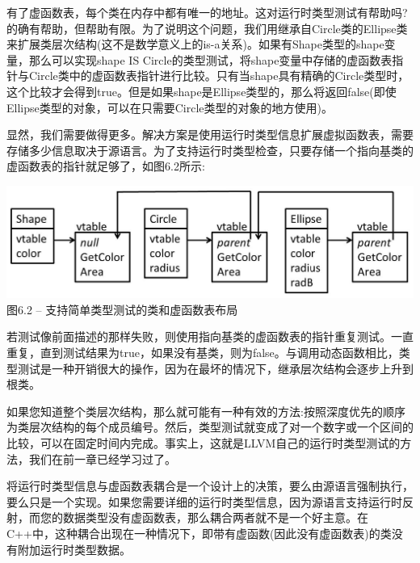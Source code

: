 有了虚函数表，每个类在内存中都有唯一的地址。这对运行时类型测试有帮助吗?的确有帮助，但帮助有限。为了说明这个问题，我们用继承自Circle类的Ellipse类来扩展类层次结构(这不是数学意义上的is-a关系)。如果有Shape类型的shape变量，那么可以实现shape IS Circle的类型测试，将shape变量中存储的虚函数表指针与Circle类中的虚函数表指针进行比较。只有当shape具有精确的Circle类型时，这个比较才会得到true。但是如果shape是Ellipse类型的，那么将返回false(即使Ellipse类型的对象，可以在只需要Circle类型的对象的地方使用)。\par

显然，我们需要做得更多。解决方案是使用运行时类型信息扩展虚拟函数表，需要存储多少信息取决于源语言。为了支持运行时类型检查，只要存储一个指向基类的虚函数表的指针就足够了，如图6.2所示:\par

\hspace*{\fill} \par %
\begin{center}
\includegraphics{content/2/chapter6/images/2.jpg}\\
图6.2 – 支持简单类型测试的类和虚函数表布局
\end{center}

若测试像前面描述的那样失败，则使用指向基类的虚函数表的指针重复测试。一直重复，直到测试结果为true，如果没有基类，则为false。与调用动态函数相比，类型测试是一种开销很大的操作，因为在最坏的情况下，继承层次结构会逐步上升到根类。\par

如果您知道整个类层次结构，那么就可能有一种有效的方法:按照深度优先的顺序为类层次结构的每个成员编号。然后，类型测试就变成了对一个数字或一个区间的比较，可以在固定时间内完成。事实上，这就是LLVM自己的运行时类型测试的方法，我们在前一章已经学习过了。\par

将运行时类型信息与虚函数表耦合是一个设计上的决策，要么由源语言强制执行，要么只是一个实现。如果您需要详细的运行时类型信息，因为源语言支持运行时反射，而您的数据类型没有虚函数表，那么耦合两者就不是一个好主意。在C++中，这种耦合出现在一种情况下，即带有虚函数(因此没有虚函数表)的类没有附加运行时类型数据。\par

